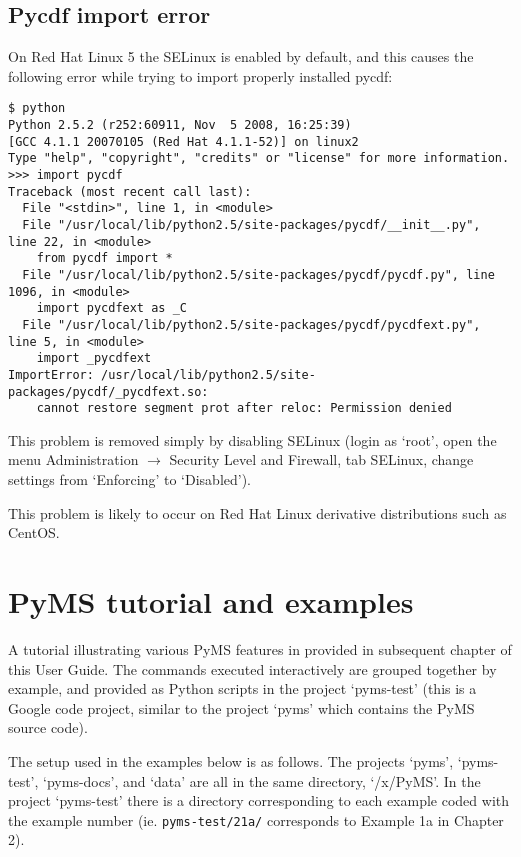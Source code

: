 \subsection{Pycdf import error}

On Red Hat Linux 5 the SELinux is enabled by default, and this causes the
following error while trying to import properly installed pycdf:

\begin{verbatim}
$ python
Python 2.5.2 (r252:60911, Nov  5 2008, 16:25:39)
[GCC 4.1.1 20070105 (Red Hat 4.1.1-52)] on linux2
Type "help", "copyright", "credits" or "license" for more information.
>>> import pycdf
Traceback (most recent call last):
  File "<stdin>", line 1, in <module>
  File "/usr/local/lib/python2.5/site-packages/pycdf/__init__.py", line 22, in <module>
    from pycdf import *
  File "/usr/local/lib/python2.5/site-packages/pycdf/pycdf.py", line 1096, in <module>
    import pycdfext as _C
  File "/usr/local/lib/python2.5/site-packages/pycdf/pycdfext.py", line 5, in <module>
    import _pycdfext
ImportError: /usr/local/lib/python2.5/site-packages/pycdf/_pycdfext.so:
    cannot restore segment prot after reloc: Permission denied
\end{verbatim}

This problem is removed simply by disabling SELinux (login as `root', open the
menu Administration $\rightarrow$ Security Level and Firewall, tab SELinux,
change settings from `Enforcing' to `Disabled').

This problem is likely to occur on Red Hat Linux derivative distributions such
as CentOS.

\section{PyMS tutorial and examples}

A tutorial illustrating various PyMS features in provided in subsequent chapter
of this User Guide. The commands executed interactively are grouped together
by example, and provided as Python scripts in the project `pyms-test' (this is
a Google code project, similar to the project `pyms' which contains the PyMS
source code).

The setup used in the examples below is as follows. The projects `pyms',
`pyms-test', `pyms-docs', and `data' are all in the same directory,
`/x/PyMS'. In the project `pyms-test' there is a directory corresponding to
each example coded with the example number (ie. {\tt pyms-test/21a/}
corresponds to Example 1a in Chapter 2).

